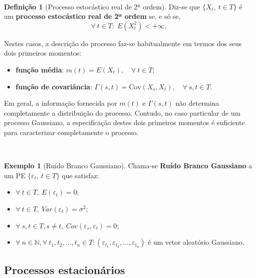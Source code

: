 \documentclass[
  11pt,
  a4paper,
]{book}
\providecommand{\tightlist}{%
  \setlength{\itemsep}{0pt}\setlength{\parskip}{0pt}}
\theoremstyle{definition}
\newtheorem{definition}{Definição}[chapter]
\theoremstyle{definition}
\newtheorem{example}{Exemplo}[chapter]
\theoremstyle{definition}
\theoremstyle{definition}
\theoremstyle{remark}
\begin{document}
\(\,\)

\begin{definition}[Processo estocástico real de 2ª ordem]
Diz-se que \(\{X_t, ~ t \in T\}\) é um \textbf{processo estocástico real de 2ª ordem} se, e só se,\\
\[
\forall ~t \in T: \; E\!\left(X_t^2\right) < +\infty.
\]

Nestes casos, a descrição do processo faz-se habitualmente em termos dos seus dois primeiros momentos:

\begin{itemize}
\tightlist
\item
  \textbf{função média}: \(m(t) = E(X_t), \quad \forall~t \in T\);
\item
  \textbf{função de covariância}: \(\Gamma(s,t) = \mathrm{Cov}(X_s, X_t), \quad \forall~s,t \in T\).
\end{itemize}

Em geral, a informação fornecida por \(m(t)\) e \(\Gamma(s,t)\) não determina completamente a distribuição do processo. Contudo, no caso particular de um processo Gaussiano, a especificação destes dois primeiros momentos é suficiente para caracterizar completamente o processo.
\end{definition}

\(\,\)

\begin{example}[Ruído Branco Gaussiano]

Chama-se \textbf{Ruído Branco Gaussiano} a um PE \(\{\varepsilon_t, ~t \in T\}\) que satisfaz:

\begin{itemize}
\item
  \(\forall ~t \in T, ~E(\varepsilon_t)=0\);
\item
  \(\forall ~t \in T, ~Var(\varepsilon_t)=\sigma^2\);
\item
  \(\forall ~s, t \in T, s \neq t, ~Cov(\varepsilon_s,\varepsilon_t)=0\);
\item
  \(\forall ~n \in \mathbb{N}, \forall ~t_1, t_2, \ldots, t_n \in T: (\varepsilon_{t_1}, \varepsilon_{t_2}, \ldots, \varepsilon_{t_n})\) é um vetor aleatório Gaussiano.
\end{itemize}

\end{example}

\subsection{Processos estacionários}\label{processos-estacionarios}
\end{document}
